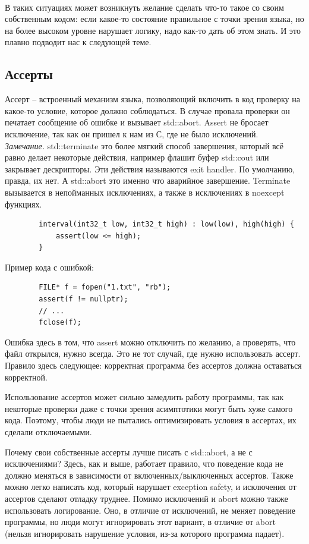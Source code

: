 \documentclass[12pt, a4paper]{article}
\begin{document}
	\\\par В таких ситуациях может возникнуть желание сделать что-то такое со своим собственным кодом: если какое-то состояние правильное с точки зрения языка, но на более высоком уровне нарушает логику, надо как-то дать об этом знать. И это плавно подводит нас к следующей теме.
	\subsection{Ассерты}
	Ассерт -- встроенный механизм языка, позволяющий включить в код проверку на какое-то условие, которое должно соблюдаться. В случае провала проверки он печатает сообщение об ошибке и вызывает std::abort. Assert не бросает исключение, так как он пришел к нам из С, где не было исключений.\\
	\textit{Замечание.} std::terminate это более мягкий способ завершения, который всё равно делает некоторые действия, например флашит буфер std::cout или закрывает дескрипторы. Эти действия называются exit handler. По умолчанию, правда, их нет. А std::abort это именно что аварийное завершение. Terminate вызывается в непойманных исключениях, а также в исключениях в noexcept функциях.
	\begin{verbatim}
		interval(int32_t low, int32_t high) : low(low), high(high) {
			assert(low <= high);
		}
	\end{verbatim}
	\par Пример кода с ошибкой:
	\begin{verbatim}
		FILE* f = fopen("1.txt", "rb");
		assert(f != nullptr);
		// ...
		fclose(f);
	\end{verbatim}
	Ошибка здесь в том, что assert можно отключить по желанию, а проверять, что файл открылся, нужно всегда. Это не тот случай, где нужно использовать ассерт. Правило здесь следующее: корректная программа без ассертов должна оставаться корректной.
	\par Использование ассертов может сильно замедлить работу программы, так как некоторые проверки даже с точки зрения асимптотики могут быть хуже самого кода. Поэтому, чтобы люди не пытались оптимизировать условия в ассертах, их сделали отключаемыми.
	\par Почему свои собственные ассерты лучше писать с std::abort, а не с исключениями? Здесь, как и выше, работает правило, что поведение кода не должно меняться в зависимости от включенных/выключенных ассертов. Также можно легко написать код, который нарушает exception safety, и исключения от ассертов сделают отладку труднее. Помимо исключений и abort можно также использовать логирование. Оно, в отличие от исключений, не меняет поведение программы, но люди могут игнорировать этот вариант, в отличие от abort (нельзя игнорировать нарушение условия, из-за которого программа падает).
\end{document}
